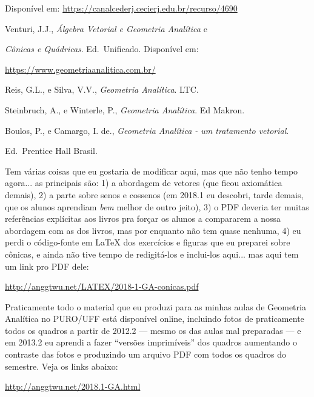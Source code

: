 \documentclass[oneside]{book}
\begin{document}
Disponível em:
\url{https://canalcederj.cecierj.edu.br/recurso/4690}

\ssk

Venturi, J.J., {\sl Álgebra Vetorial e Geometria Analítica} e

{\sl Cônicas e Quádricas}. Ed.\ Unificado. Disponível em:

\url{https://www.geometriaanalitica.com.br/}

\ssk

Reis, G.L., e Silva, V.V., {\sl Geometria Analítica}. LTC.

\ssk

Steinbruch, A., e Winterle, P., {\sl Geometria Analítica}. Ed Makron.

\ssk

Boulos, P., e Camargo, I. de., {\sl Geometria Analítica - um
  tratamento vetorial}.

Ed.\ Prentice Hall Brasil.


\msk

Tem várias coisas que eu gostaria de modificar aqui, mas que não tenho
tempo agora... as principais são: 1) a abordagem de vetores (que ficou
axiomática demais), 2) a parte sobre senos e cossenos (em 2018.1 eu
descobri, tarde demais, que os alunos aprendiam {\sl bem} melhor de
outro jeito), 3) o PDF deveria ter muitas referências explícitas aos
livros pra forçar os alunos a compararem a nossa abordagem com as dos
livros, mas por enquanto não tem quase nenhuma, 4) eu perdi o
código-fonte em \LaTeX{} dos exercícios e figuras que eu preparei
sobre cônicas, e ainda não tive tempo de redigitá-los e inclui-los
aqui... mas aqui tem um link pro PDF dele:

\msk

\url{http://anggtwu.net/LATEX/2018-1-GA-conicas.pdf}

\bsk

Praticamente todo o material que eu produzi para as minhas aulas de
Geometria Analítica no PURO/UFF está disponível online, incluindo
fotos de praticamente todos os quadros a partir de 2012.2 --- mesmo os
das aulas mal preparadas --- e em 2013.2 eu aprendi a fazer ``versões
imprimíveis'' dos quadros aumentando o contraste das fotos e
produzindo um arquivo PDF com todos os quadros do semestre. Veja os
links abaixo:

\msk

\url{http://anggtwu.net/2018.1-GA.html}
\end{document}
